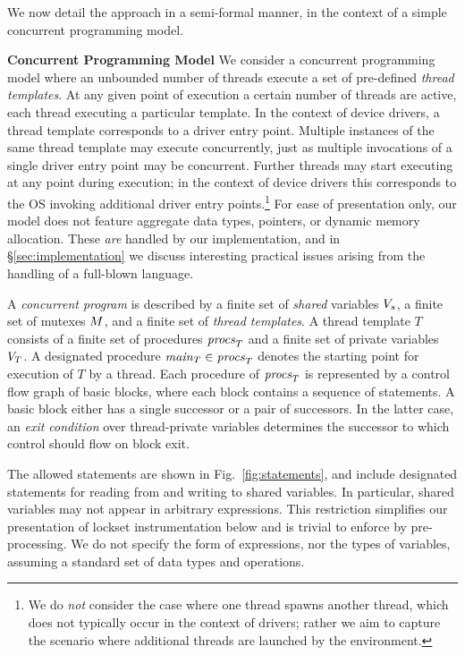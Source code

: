 We now detail the approach in a semi-formal manner, in the context of a simple concurrent programming model.

\noindent\textbf{Concurrent Programming Model }
%
We consider a concurrent programming model where an unbounded number of threads execute a set of pre-defined \emph{thread templates}.  At any given point of execution a certain number of threads are active, each thread executing a particular template.  In the context of device drivers, a thread template corresponds to a driver entry point.  Multiple instances of the same thread template may execute concurrently, just as multiple invocations of a single driver entry point may be concurrent.  Further threads may start executing at any point during execution; in the context of device drivers this corresponds to the OS invoking additional driver entry points.\footnote{We do \emph{not} consider the case where one thread spawns another thread, which does not typically occur in the context of drivers; rather we aim to capture the scenario where additional threads are launched by the environment.}  For ease of presentation only, our model does not feature aggregate data types, pointers, or dynamic memory allocation.  These \emph{are} handled by our implementation, and in \S\ref{sec:implementation} we discuss interesting practical issues arising from the handling of a full-blown language.

A \emph{concurrent program} is described by a finite set of \emph{shared} variables $V_s$, a finite set of mutexes $M$, and a finite set of \emph{thread templates}.  A thread template $T$ consists of a finite set of procedures $\mathit{procs}_{T}$ and a finite set of private variables $V_{T}$.  A designated procedure $\mathit{main}_{T} \in \mathit{procs}_{T}$ denotes the starting point for execution of $T$ by a thread.  Each procedure of $\mathit{procs}_{T}$ is represented by a control flow graph of basic blocks, where each block contains a sequence of statements.  A basic block either has a single successor or a pair of successors.  In the latter case, an \emph{exit condition} over thread-private variables determines the successor to which control should flow on block exit.

The allowed statements are shown in Fig.~\ref{fig:statements}, and include designated statements for reading from and writing to shared variables.  In particular, shared variables may not appear in arbitrary expressions.  This restriction simplifies our presentation of lockset instrumentation below and is trivial to enforce by pre-processing.  We do not specify the form of expressions, nor the types of variables, assuming a standard set of data types and operations.

